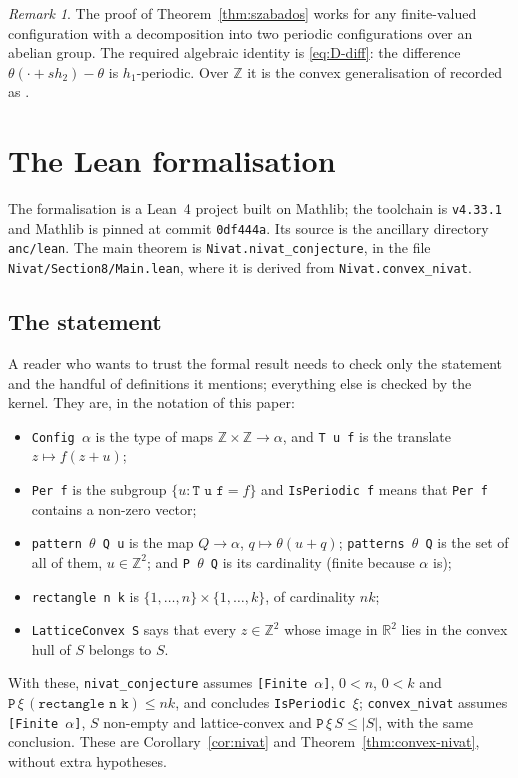 \documentclass[11pt,reqno]{amsart}
\theoremstyle{plain}
\theoremstyle{definition}
\theoremstyle{remark}
\newtheorem{rem}[thm]{Remark}
\theoremstyle{plain}
\theoremstyle{remark}
\theoremstyle{definition}
\numberwithin{equation}{section}
\newcommand{\R}{\mathbb{R}}
\newcommand{\Z}{\mathbb{Z}}
\begin{document}
\begin{rem}\label{rem:szab-general}
The proof of Theorem~\ref{thm:szabados} works for any finite-valued configuration
with a decomposition into two periodic configurations over an abelian group.
The required algebraic identity is \eqref{eq:D-diff}: the difference
$\theta(\cdot+sh_2)-\theta$ is $h_1$-periodic.  Over $\Z$ it is
the convex generalisation of \cite[Theorem~1]{Sz} recorded as
\cite[Theorem~1.7]{Colle23a}.
\end{rem}

\section{The Lean formalisation}\label{app:lean}

The formalisation is a Lean~4 project built on Mathlib; the toolchain is
\texttt{v4.33.1} and Mathlib is pinned at commit \texttt{0df444a}.  Its source
is the ancillary directory \texttt{anc/lean}.  The main theorem is
\texttt{Nivat.nivat\_conjecture}, in the file
\texttt{Nivat/Section8/Main.lean}, where it is derived from
\texttt{Nivat.convex\_nivat}.

\subsection*{The statement}
A reader who wants to trust the formal result needs to check only the statement
and the handful of definitions it mentions; everything else is checked by the
kernel.  They are, in the notation of this paper:
\begin{itemize}
\item \texttt{Config $\alpha$} is the type of maps $\Z\times\Z\to\alpha$, and
  \texttt{T u f} is the translate $z\mapsto f(z+u)$;
\item \texttt{Per f} is the subgroup $\{u: \texttt{T u f}=f\}$ and
  \texttt{IsPeriodic f} means that \texttt{Per f} contains a non-zero vector;
\item \texttt{pattern $\theta$ Q u} is the map $Q\to\alpha$, $q\mapsto\theta(u+q)$;
  \texttt{patterns $\theta$ Q} is the set of all of them, $u\in\Z^2$; and
  \texttt{P $\theta$ Q} is its cardinality (finite because $\alpha$ is);
\item \texttt{rectangle n k} is $\{1,\dots,n\}\times\{1,\dots,k\}$, of
  cardinality $nk$;
\item \texttt{LatticeConvex S} says that every $z\in\Z^2$ whose image in
  $\R^2$ lies in the convex hull of $S$ belongs to $S$.
\end{itemize}
With these, \texttt{nivat\_conjecture} assumes \texttt{[Finite $\alpha$]},
$0<n$, $0<k$ and $\texttt{P}\,\xi\,(\texttt{rectangle n k})\le nk$, and
concludes \texttt{IsPeriodic $\xi$}; \texttt{convex\_nivat} assumes
\texttt{[Finite $\alpha$]}, $S$ non-empty and lattice-convex and
$\texttt{P}\,\xi\,S\le|S|$, with the same conclusion.  These are
Corollary~\ref{cor:nivat} and Theorem~\ref{thm:convex-nivat}, without extra
hypotheses.
\end{document}
